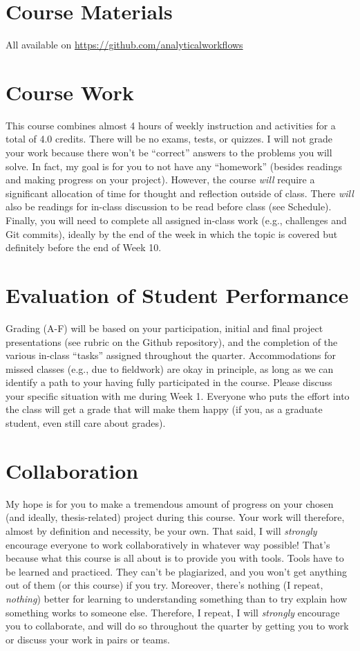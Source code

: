 \documentclass[10pt]{article}
\begin{document}
\section*{Course Materials}
\noindent
All available on \href{https://github.com/analyticalworkflows}{https://github.com/analyticalworkflows}

\section*{Course Work}
This course combines almost 4 hours of weekly instruction and activities for a total of 4.0 credits.
There will be no exams, tests, or quizzes.
I will not grade your work because there won't be ``correct'' answers to the problems you will 
solve.
In fact, my goal is for you to not have any ``homework'' (besides readings and making progress on your 
project).
However, the course \textit{will} require a significant allocation of time for thought and reflection outside 
of class.
There \textit{will} also be readings for in-class discussion to be read before class (see Schedule).
Finally, you will need to complete all assigned in-class work (e.g., challenges and Git commits), ideally 
by the end of the week in which the topic is covered but definitely before the end of Week 10.

\section*{Evaluation of Student Performance}
Grading (A-F) will be based on your participation, 
initial and final project presentations (see rubric on the Github repository), 
and the completion of the various in-class ``tasks'' assigned throughout the quarter.
Accommodations for missed classes (e.g., due to fieldwork) are okay in principle, as long as we can 
identify a path to your having fully participated in the course. 
Please discuss your specific situation with me during Week 1. 
Everyone who puts the effort into the class will get a grade that will make them happy (if you, as a 
graduate student, even still care about grades).

\section*{Collaboration}
My hope is for you to make a tremendous amount of progress on your chosen (and ideally, 
thesis-related) project during this course.
Your work will therefore, almost by definition and necessity, be your own.
That said, I will \textit{strongly} encourage everyone to work collaboratively in whatever way possible!
That's because what this course is all about is to provide you with tools.
Tools have to be learned and practiced.
They can't be plagiarized, and you won't get anything out of them (or this course) if you try.
Moreover, there's nothing (I repeat, \textit{nothing}) better for learning to understanding something than 
to try explain how something works to someone else.
Therefore, I repeat, I will \textit{strongly} encourage you to collaborate, and will do so throughout the 
quarter by getting you to work or discuss your work in pairs or teams.
\end{document}
